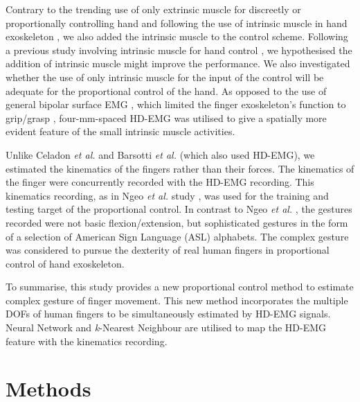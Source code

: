 \documentclass[conference]{IEEEtran}
\begin{document}
Contrary to the trending use of only extrinsic muscle for discreetly or proportionally controlling hand
\cite{b16}\cite{b20} and following the use of intrinsic muscle in hand exoskeleton \cite{b11}\cite{b12}, we also added the intrinsic 
muscle to the control scheme. Following a previous study involving intrinsic muscle for hand control \cite{b22}, 
we hypothesised the addition of intrinsic muscle might improve the performance. We also investigated 
whether the use of only intrinsic muscle for the input of the control will be adequate for the proportional 
control of the hand. As opposed to the use of general bipolar surface EMG \cite{b23}, which limited the finger 
exoskeleton’s function to grip/grasp \cite{b12}, four-mm-spaced HD-EMG was utilised to give a spatially more 
evident feature of the small intrinsic muscle activities.

Unlike Celadon \textit{et al.} \cite{b2} and Barsotti \textit{et al.} \cite{b24} (which also used HD-EMG), we estimated the 
kinematics of the fingers rather than their forces. The kinematics of the finger were concurrently recorded 
with the HD-EMG recording. This kinematics recording, as in Ngeo \textit{et al.} study \cite{b16}, was used for the 
training and testing target of the proportional control. In contrast to Ngeo \textit{et al.} \cite{b16}, the gestures recorded 
were not basic flexion/extension, but sophisticated gestures in the form of a selection of American Sign 
Language (ASL) alphabets. The complex gesture was considered to pursue the dexterity of real human 
fingers in proportional control of hand exoskeleton.

To summarise, this study provides a new proportional control method to estimate complex gesture of 
finger movement. This new method incorporates the multiple DOFs of human fingers to be simultaneously 
estimated by HD-EMG signals. Neural Network and \textit{k}-Nearest Neighbour are utilised to map the HD-EMG 
feature with the kinematics recording.


\section{Methods}
\end{document}
